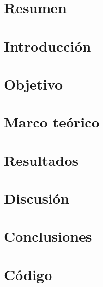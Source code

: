 \documentclass[12pt,letterpaper]{article}
\begin{document}

\section{Resumen}

\section{Introducción}

\section{Objetivo}

\section{Marco teórico}

\section{Resultados}

\section{Discusión}

\section{Conclusiones}

\section{Código}

\nocite{*}

\end{document}
